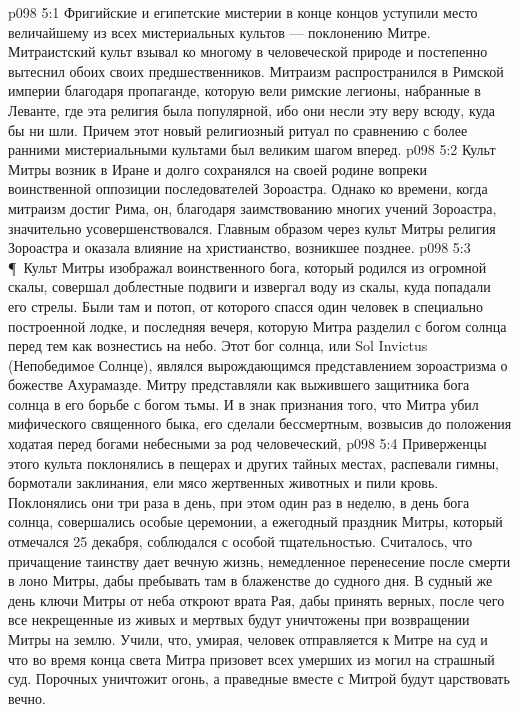 \vs p098 5:1 Фригийские и египетские мистерии в конце концов уступили место величайшему из всех мистериальных культов --- поклонению Митре. Митраистский культ взывал ко многому в человеческой природе и постепенно вытеснил обоих своих предшественников. Митраизм распространился в Римской империи благодаря пропаганде, которую вели римские легионы, набранные в Леванте, где эта религия была популярной, ибо они несли эту веру всюду, куда бы ни шли. Причем этот новый религиозный ритуал по сравнению с более ранними мистериальными культами был великим шагом вперед.
\vs p098 5:2 Культ Митры возник в Иране и долго сохранялся на своей родине вопреки воинственной оппозиции последователей Зороастра. Однако ко времени, когда митраизм достиг Рима, он, благодаря заимствованию многих учений Зороастра, значительно усовершенствовался. Главным образом через культ Митры религия Зороастра и оказала влияние на христианство, возникшее позднее.
\vs p098 5:3 \P\ Культ Митры изображал воинственного бога, который родился из огромной скалы, совершал доблестные подвиги и извергал воду из скалы, куда попадали его стрелы. Были там и потоп, от которого спасся один человек в специально построенной лодке, и последняя вечеря, которую Митра разделил с богом солнца перед тем как вознестись на небо. Этот бог солнца, или Sol Invictus (Непобедимое Солнце), являлся вырождающимся представлением зороастризма о божестве Ахурамазде. Митру представляли как выжившего защитника бога солнца в его борьбе с богом тьмы. И в знак признания того, что Митра убил мифического священного быка, его сделали бессмертным, возвысив до положения ходатая перед богами небесными за род человеческий,
\vs p098 5:4 Приверженцы этого культа поклонялись в пещерах и других тайных местах, распевали гимны, бормотали заклинания, ели мясо жертвенных животных и пили кровь. Поклонялись они три раза в день, при этом один раз в неделю, в день бога солнца, совершались особые церемонии, а ежегодный праздник Митры, который отмечался 25 декабря, соблюдался с особой тщательностью. Считалось, что причащение таинству дает вечную жизнь, немедленное перенесение после смерти в лоно Митры, дабы пребывать там в блаженстве до судного дня. В судный же день ключи Митры от неба откроют врата Рая, дабы принять верных, после чего все некрещенные из живых и мертвых будут уничтожены при возвращении Митры на землю. Учили, что, умирая, человек отправляется к Митре на суд и что во время конца света Митра призовет всех умерших из могил на страшный суд. Порочных уничтожит огонь, а праведные вместе с Митрой будут царствовать вечно.
